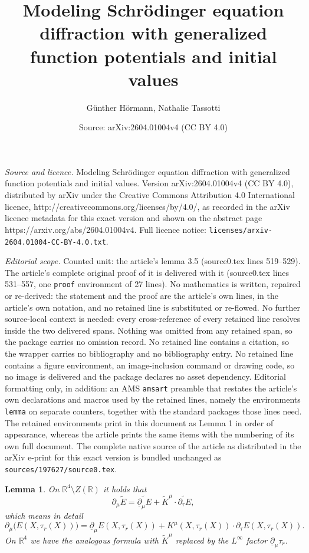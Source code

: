 \documentclass[10pt,a4paper]{amsart}
\title{Modeling Schr\"odinger equation diffraction with generalized function potentials and initial values}
\author{G\"unther H\"ormann, Nathalie Tassotti}
\date{Source: arXiv:2604.01004v4 (CC BY 4.0)}
\newtheorem{lemma}{Lemma}
\newcommand{\R}{\mb{R}}
\newcommand{\beq}{\begin{equation}}
\renewcommand{\d}{\ensuremath{\partial}}
\newcommand{\eeq}{\end{equation}}
\newcommand{\mb}[1]{\ensuremath{\mathbb{#1}}}
\newcommand{\ud}{\underline{\d}}
\begin{document}
\maketitle

\noindent\emph{Source and licence.} Modeling Schr\"odinger equation diffraction with generalized function potentials and initial values. Version arXiv:2604.01004v4 (CC BY 4.0), distributed by arXiv under the Creative Commons Attribution 4.0 International licence, http://creativecommons.org/licenses/by/4.0/, as recorded in the arXiv licence metadata for this exact version and shown on the abstract page https://arxiv.org/abs/2604.01004v4. Full licence notice: \texttt{licenses/arxiv-2604.01004-CC-BY-4.0.txt}.\par\smallskip

\noindent\textit{Editorial scope.} Counted unit: the article's lemma 3.5 (source0.tex lines 519--529). The article's complete original proof of it is delivered with it (source0.tex lines 531--557, one \texttt{proof} environment of 27 lines). No mathematics is written, repaired or re-derived: the statement and the proof are the article's own lines, in the article's own notation, and no retained line is substituted or re-flowed.  No further source-local context is needed: every cross-reference of every retained line resolves inside the two delivered spans.  Nothing was omitted from any retained span, so the package carries no omission record.  No retained line contains a citation, so the wrapper carries no bibliography and no bibliography entry.  No retained line contains a figure environment, an image-inclusion command or drawing code, so no image is delivered and the package declares no asset dependency.  Editorial formatting only, in addition: an AMS \texttt{amsart} preamble that restates the article's own declarations and macros used by the retained lines, namely the environments \texttt{lemma} on separate counters, together with the standard packages those lines need.  The retained environments print in this document as Lemma 1 in order of appearance, whereas the article prints the same items with the numbering of its own full document.  The complete native source of the article as distributed in the arXiv e-print for this exact version is bundled unchanged as \texttt{sources/197627/source0.tex}.
\begin{lemma}
On $\R^4 \setminus Z(\R)$ it holds that
\beq\label{3.5}
\d_\mu \widetilde{E} = \widetilde{\ud_\mu E}  + \widetilde{K}^\mu \cdot \widetilde{\d_\tau E},
\eeq
which means in detail
\beq\label{3.5V}
   \d_\mu \Big( E(X,\tau_r(X)) \Big) = \ud_\mu E(X,\tau_r(X)) + K^\mu(X,\tau_r(X)) \cdot \d_\tau E(X,\tau_r(X)).
\eeq
On $\R^4$ we have the analogous formula with $\widetilde{K}^\mu$ replaced by the $L^\infty$ factor $\ud_\mu \tau_r$.
\end{lemma}
\end{document}
